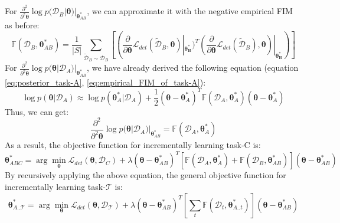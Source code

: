 \documentclass{article}
\begin{document}
For $\frac{\partial^2}{\partial^2 \boldsymbol{\theta}}
\log p(\mathcal D_B | \boldsymbol{\theta})|_{\boldsymbol{\theta}_{AB}^*}$, we can approximate it with the negative empirical FIM as before:
\begin{equation}
\mathbb{F}(\mathcal D_B, \boldsymbol{\theta}_{AB}^*)
= \frac{1}{|S|}
\sum_{\tilde{\mathcal D}_B \sim \mathcal D_B}
[(\frac{\partial}{\partial \boldsymbol{\theta}} \mathcal L_{det}(\tilde{\mathcal D}_B, \boldsymbol{\theta})|_{\boldsymbol{\theta_{B}^*}})^T
(\frac{\partial}{\partial \boldsymbol{\theta}} \mathcal L_{det}(\tilde{\mathcal D}_B), \boldsymbol{\theta})|_{\boldsymbol{\theta_{B}^*}})]
\end{equation}
For $\frac{\partial^2}{\partial^2 \boldsymbol{\theta}}
\log p(\boldsymbol{\theta} | \mathcal D_A)|_{\boldsymbol{\theta}_{AB}^*}$,
we have already derived the following equation (equation \ref{eq:posterior_task-A}, \ref{eq:empirical_FIM_of_task-A}):
\begin{equation}
\log p(\boldsymbol{\theta}|\mathcal D_A)
\approx \log p(\boldsymbol{\theta}_A^*|\mathcal D_A)
+ \frac{1}{2}
(\boldsymbol{\theta} - \boldsymbol{\theta}_A^*)^T
\mathbb{F}(\mathcal D_A, \boldsymbol{\theta}_A^*)
(\boldsymbol{\theta} - \boldsymbol{\theta}_A^*)
\end{equation}
Thus, we can get:
\begin{equation}
\frac{\partial^2}{\partial^2 \boldsymbol{\theta}}
\log p(\boldsymbol{\theta} | \mathcal D_A)|_{\boldsymbol{\theta}_{AB}^*}
= \mathbb{F}(\mathcal D_A, \boldsymbol{\theta}_A^*)
\end{equation}
As a result, the objective function for incrementally learning task-C is:
\begin{equation}
    \boldsymbol{\theta}_{ABC}^* = \arg \min_{\boldsymbol{\theta}}
    \mathcal L_{det}(\boldsymbol{\theta}, \mathcal D_C) + 
    \lambda (\boldsymbol{\theta} - \boldsymbol{\theta}_{AB}^*)^T
    [\mathbb{F}(\mathcal D_A, \boldsymbol{\theta}_A^*)
    + \mathbb{F}(\mathcal D_B, \boldsymbol{\theta}_{AB}^*)]
    (\boldsymbol{\theta} - \boldsymbol{\theta}_{AB}^*)
\end{equation}
By recursively applying the above equation, the general objective function for incrementally learning task-$\mathcal T$ is:
\begin{equation}
    \boldsymbol{\theta}_{A..\mathcal T}^* = \arg \min_{\boldsymbol{\theta}}
    \mathcal L_{det}(\boldsymbol{\theta}, \mathcal D_{\mathcal T}) + 
    \lambda (\boldsymbol{\theta} - \boldsymbol{\theta}_{AB}^*)^T
    [\sum_{t} \mathbb{F}(\mathcal D_t, \boldsymbol{\theta}_{A..t}^*)]
    (\boldsymbol{\theta} - \boldsymbol{\theta}_{AB}^*)
\end{equation}
\end{document}

